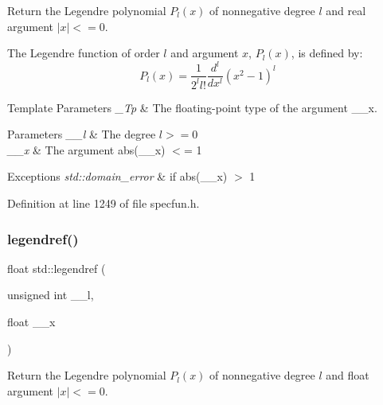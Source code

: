 Return the Legendre polynomial $ P_l(x) $ of nonnegative degree $ l $ and real argument $ |x| <= 0 $.

The Legendre function of order $ l $ and argument $ x $, $ P_l(x) $, is defined by\+: \[ P_l(x) = \frac{1}{2^l l!}\frac{d^l}{dx^l}(x^2 - 1)^{l} \]


\begin{DoxyTemplParams}{Template Parameters}
{\em \+\_\+\+Tp} & The floating-\/point type of the argument {\ttfamily \+\_\+\+\_\+x}. \\
\hline
\end{DoxyTemplParams}

\begin{DoxyParams}{Parameters}
{\em \+\_\+\+\_\+l} & The degree $ l >= 0 $ \\
\hline
{\em \+\_\+\+\_\+x} & The argument {\ttfamily abs(\+\_\+\+\_\+x)} $<$= 1 \\
\hline
\end{DoxyParams}

\begin{DoxyExceptions}{Exceptions}
{\em std\+::domain\+\_\+error} & if {\ttfamily abs(\+\_\+\+\_\+x)} $>$ 1 \\
\hline
\end{DoxyExceptions}


Definition at line 1249 of file specfun.\+h.

\mbox{\label{group__cxx17__math__spec__func_gaed94e3c664c99f5204da75be75aeac21}} 
\subsubsection{\texorpdfstring{legendref()}{legendref()}}
{\footnotesize\ttfamily float std\+::legendref (\begin{DoxyParamCaption}\item[{unsigned int}]{\+\_\+\+\_\+l,  }\item[{float}]{\+\_\+\+\_\+x }\end{DoxyParamCaption})\hspace{0.3cm}{\ttfamily [inline]}}

Return the Legendre polynomial $ P_l(x) $ of nonnegative degree $ l $ and {\ttfamily float} argument $ |x| <= 0 $.

